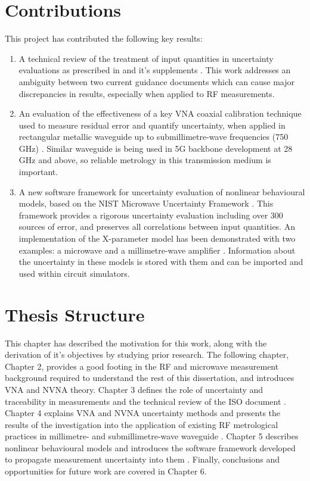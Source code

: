\documentclass[../thesis/thesis.tex]{subfiles}
\begin{document}
\begin{refsection}
\section{Contributions}
This project has contributed the following key results:
\begin{enumerate}
	\item A technical review \cite{Stant_2016} of the treatment of input quantities in uncertainty evaluations as prescribed in \cite{GUM_2008} and it's supplements \cite{GUM_S1,GUM_S2}. This work addresses an ambiguity between two current guidance documents which can cause major discrepancies in results, especially when applied to RF measurements.
	\item An evaluation of the effectiveness of a key VNA coaxial calibration technique used to measure residual error and quantify uncertainty, when applied in rectangular metallic waveguide up to submillimetre-wave frequencies (750 GHz) \cite{Stant_2017}. Similar waveguide is being used in 5G backbone development at 28 GHz and above, so reliable metrology in this transmission medium is important.
	\item A new software framework for uncertainty evaluation of nonlinear behavioural models, based on the NIST Microwave Uncertainty Framework \cite{MUFWebsite}. This framework provides a rigorous uncertainty evaluation including over 300 sources of error, and preserves all correlations between input quantities. An implementation of the X-parameter model has been demonstrated with two examples: a microwave and a millimetre-wave amplifier \cite{Stant_2018_TMTT}. Information about the uncertainty in these models is stored with them and can be imported and used within circuit simulators.
\end{enumerate}

\section{Thesis Structure}
This chapter has described the motivation for this work, along with the derivation of it's objectives by studying prior research. The following chapter, Chapter 2, provides a good footing in the RF and microwave measurement background required to understand the rest of this dissertation, and introduces VNA and NVNA theory. Chapter 3 defines the role of uncertainty and traceability in measurements and the technical review of the ISO document \cite{Stant_2016}. Chapter 4 explains VNA and NVNA uncertainty methods and presents the results of the investigation into the application of existing RF metrological practices in millimetre- and submillimetre-wave waveguide \cite{Stant_2017}. Chapter 5 describes nonlinear behavioural models and introduces the software framework developed to propagate measurement uncertainty into them \cite{Stant_2018_TMTT}. Finally, conclusions and opportunities for future work are covered in Chapter 6.
\printbibliography
\end{refsection}
\end{document}
